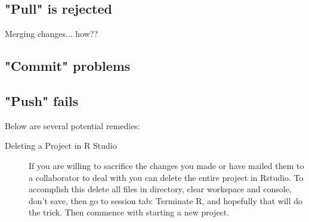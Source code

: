 \documentclass{article}
\begin{document}
\subsection{"Pull" is rejected}

Merging changes... how??

\subsection{"Commit" problems}

\subsection{"Push" fails}

Below are several potential remedies:

\begin{description}
  \item[Deleting a Project in R Studio]If you are willing to sacrifice the changes you made or have mailed them to a collaborator to deal with you can delete the entire project in Rstudio. To accomplish this delete all files in directory, clear workspace and console, don't save, then go to session tab: Terminate R, and hopefully that will do the trick. Then commence with starting a new project. 

\end{description}
\end{document}
